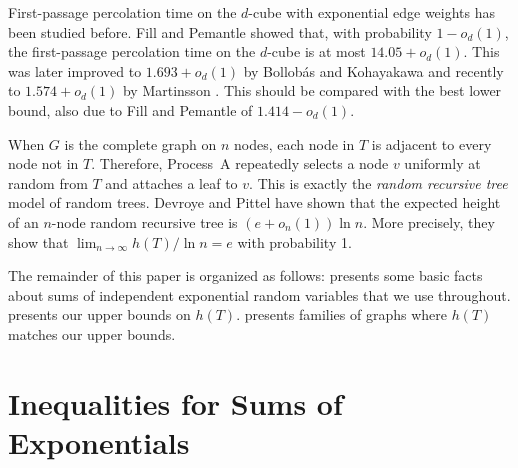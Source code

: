 \documentclass{patmorin}
\begin{document}
First-passage percolation time on the $d$-cube with exponential
edge weights has been studied before.  Fill and Pemantle
\cite{fill.pemantle:percolation} showed that, with probability
$1-o_d(1)$, the first-passage percolation time on the $d$-cube is at
most $14.05+o_d(1)$.  This was later improved to $1.693 +o_d(1)$ by
Bollob\'as and Kohayakawa \cite{bollobas.kohayakawa:on} and recently to
$1.574 +o_d(1)$ by Martinsson \cite{martinsson:unoriented}.  This should
be compared with the best lower bound, also due to Fill and Pemantle
\cite{fill.pemantle:percolation} of $1.414-o_d(1)$.

When $G$ is the complete graph on $n$ nodes, each node in $T$ is adjacent
to every node not in $T$.  Therefore, Process~A repeatedly selects
a node $v$ uniformly at random from $T$ and attaches a leaf to $v$.
This is exactly the \emph{random recursive tree} model of random trees.
Devroye \cite{devroye:branching} and Pittel \cite{pittel:note} have
shown that the expected height of an $n$-node random recursive tree is
$(e+o_n(1))\ln n$.  More precisely, they show that $\lim_{n\to\infty}
h(T)/\ln n = e$ with probability 1.

The remainder of this paper is organized as follows:
 presents some basic facts about sums of
independent exponential random variables that we use throughout.
 presents our upper bounds on $h(T)$.
 presents families of graphs where $h(T)$ matches our upper
bounds.

\section{Inequalities for Sums of Exponentials}
\end{document}
